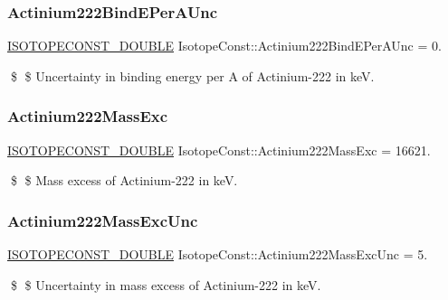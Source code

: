 \subsubsection{\texorpdfstring{Actinium222\+Bind\+E\+Per\+A\+Unc}{Actinium222BindEPerAUnc}}
{\footnotesize\ttfamily \mbox{\hyperlink{group___isotope_const-_macros_ga8f45a7272ce02c0b4c65c44636ed719a}{I\+S\+O\+T\+O\+P\+E\+C\+O\+N\+S\+T\+\_\+\+D\+O\+U\+B\+LE}} Isotope\+Const\+::\+Actinium222\+Bind\+E\+Per\+A\+Unc = 0.}

\$ \$ Uncertainty in binding energy per A of Actinium-\/222 in keV. \mbox{\label{group___isotope_const-_actinium-_ac222_ga70e9d59a0812d6e422a9abe5fa11279e}} 
\subsubsection{\texorpdfstring{Actinium222\+Mass\+Exc}{Actinium222MassExc}}
{\footnotesize\ttfamily \mbox{\hyperlink{group___isotope_const-_macros_ga8f45a7272ce02c0b4c65c44636ed719a}{I\+S\+O\+T\+O\+P\+E\+C\+O\+N\+S\+T\+\_\+\+D\+O\+U\+B\+LE}} Isotope\+Const\+::\+Actinium222\+Mass\+Exc = 16621.}

\$ \$ Mass excess of Actinium-\/222 in keV. \mbox{\label{group___isotope_const-_actinium-_ac222_ga065b5d58991991f4335b3da3ea882912}} 
\subsubsection{\texorpdfstring{Actinium222\+Mass\+Exc\+Unc}{Actinium222MassExcUnc}}
{\footnotesize\ttfamily \mbox{\hyperlink{group___isotope_const-_macros_ga8f45a7272ce02c0b4c65c44636ed719a}{I\+S\+O\+T\+O\+P\+E\+C\+O\+N\+S\+T\+\_\+\+D\+O\+U\+B\+LE}} Isotope\+Const\+::\+Actinium222\+Mass\+Exc\+Unc = 5.}

\$ \$ Uncertainty in mass excess of Actinium-\/222 in keV. \mbox{\label{group___isotope_const-_actinium-_ac222_ga553c4704e267e922136a83586ee62492}} 
